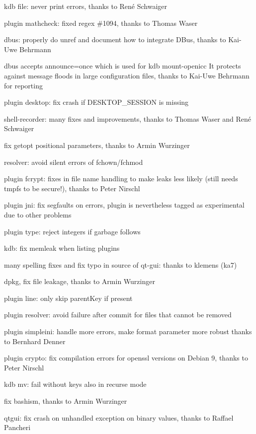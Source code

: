 \begin{DoxyItemize}
\item {\ttfamily kdb file}\+: never print errors, thanks to René Schwaiger
\item plugin mathcheck\+: fixed regex \#1094, thanks to Thomas Waser
\item dbus\+: properly do unref and document how to integrate D\+Bus, thanks to Kai-\/\+Uwe Behrmann
\item dbus accepts announce=once which is used for {\ttfamily kdb mount-\/openicc} It protects against message floods in large configuration files, thanks to Kai-\/\+Uwe Behrmann for reporting
\item plugin desktop\+: fix crash if {\ttfamily D\+E\+S\+K\+T\+O\+P\+\_\+\+S\+E\+S\+S\+I\+ON} is missing
\item shell-\/recorder\+: many fixes and improvements, thanks to Thomas Waser and René Schwaiger
\item fix getopt positional parameters, thanks to Armin Wurzinger
\item resolver\+: avoid silent errors of fchown/fchmod
\item plugin fcrypt\+: fixes in file name handling to make leaks less likely (still needs tmpfs to be secure!), thanks to Peter Nirschl
\item plugin jni\+: fix segfaults on errors, plugin is nevertheless tagged as experimental due to other problems
\item plugin type\+: reject integers if garbage follows
\item {\ttfamily kdb}\+: fix memleak when listing plugins
\item many spelling fixes and fix typo in source of qt-\/gui\+: thanks to klemens (ka7)
\item dpkg, fix file leakage, thanks to Armin Wurzinger
\item plugin line\+: only skip parent\+Key if present
\item plugin resolver\+: avoid failure after commit for files that cannot be removed
\item plugin simpleini\+: handle more errors, make format parameter more robust thanks to Bernhard Denner
\item plugin crypto\+: fix compilation errors for openssl versions on Debian 9, thanks to Peter Nirschl
\item {\ttfamily kdb mv}\+: fail without keys also in recurse mode
\item fix bashism, thanks to Armin Wurzinger
\item qtgui\+: fix crash on unhandled exception on binary values, thanks to Raffael Pancheri
\end{DoxyItemize}

